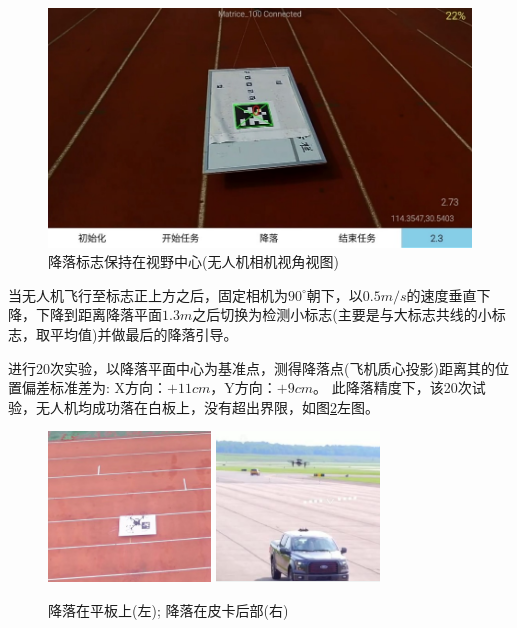 \begin{figure}[h]
    \centering
    \includegraphics[width=12cm]{figures/移动降落.jpg}
    \caption{降落标志保持在视野中心(无人机相机视角视图)}\label{Landing}
\end{figure}


当无人机飞行至标志正上方之后，固定相机为$90^\circ$朝下，以$0.5m/s$的速度垂直下降，下降到距离降落平面$1.3m$之后切换为检测小标志(主要是与大标志共线的小标志，取平均值)并做最后的降落引导。

进行20次实验，以降落平面中心为基准点，测得降落点(飞机质心投影)距离其的位置偏差标准差为:
X方向：$+11cm$，Y方向：$+9cm$。
此降落精度下，该20次试验，无人机均成功落在白板上，没有超出界限，如图\ref{Landing}左图。

\begin{figure}[h]
    \centering
    \includegraphics[height=4cm]{figures/移动降落卡车1.png}
    \quad
    \includegraphics[height=4cm]{figures/移动降落卡车2.png}
    \caption{ 降落在平板上(左); 降落在皮卡后部(右)}\label{Landing}
\end{figure}

